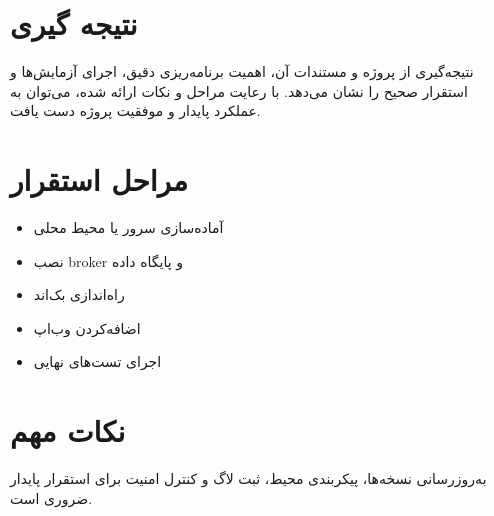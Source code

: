 \section{نتیجه گیری}

نتیجه‌گیری از پروژه و مستندات آن، اهمیت برنامه‌ریزی دقیق، اجرای آزمایش‌ها و استقرار صحیح را نشان می‌دهد. با رعایت مراحل و نکات ارائه شده، می‌توان به عملکرد پایدار و موفقیت پروژه دست یافت.

\section{مراحل استقرار}

\begin{itemize}
    \item آماده‌سازی سرور یا محیط محلی
    \item نصب broker و پایگاه داده
    \item راه‌اندازی بک‌اند
    \item اضافه‌کردن وب‌اپ
    \item اجرای تست‌های نهایی
\end{itemize}

\section{نکات مهم}

به‌روزرسانی نسخه‌ها، پیکربندی محیط، ثبت لاگ و کنترل امنیت برای استقرار پایدار ضروری است.
